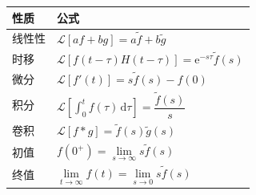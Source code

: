 \begin{table}[htbp]
\centering
\begin{tabular}{ll}
\toprule
\textbf{性质} & \textbf{公式} \\
\midrule
线性性 & $\mathcal{L}[af + bg] = a\tilde{f} + b\tilde{g}$ \\
时移 & $\mathcal{L}[f(t-\tau)H(t-\tau)] = \mathrm{e}^{-s\tau}\tilde{f}(s)$ \\
微分 & $\mathcal{L}[f'(t)] = s\tilde{f}(s) - f(0)$ \\
积分 & $\mathcal{L}\left[\int_0^t f(\tau)\,\mathrm{d}\tau\right] = \dfrac{\tilde{f}(s)}{s}$ \\[8pt]
卷积 & $\mathcal{L}[f * g] = \tilde{f}(s)\tilde{g}(s)$ \\
初值 & $f(0^+) = \lim\limits_{s\to\infty} s\tilde{f}(s)$ \\
终值 & $\lim\limits_{t\to\infty} f(t) = \lim\limits_{s\to 0} s\tilde{f}(s)$ \\
\bottomrule
\end{tabular}
\end{table}

